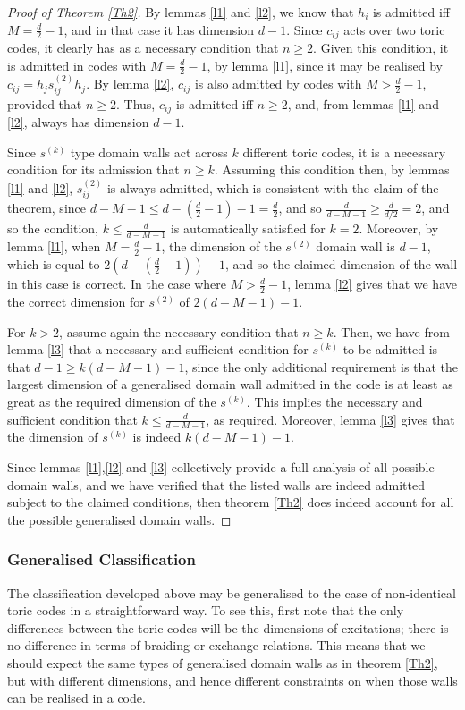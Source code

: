 \documentclass[pra,twocolumn,a4paper,nofootinbib]{revtex4-1}
\begin{document}
\begin{proof} [Proof of Theorem \ref{Th2}]
By lemmas \ref{l1} and \ref{l2}, we know that $h_i$ is admitted iff $M=\frac{d}{2}-1$, and in that case it has dimension $d-1$. Since $c_{ij}$ acts over two toric codes, it clearly has as a necessary condition that $n\geq 2$. Given this condition, it is admitted in codes with $M=\frac{d}{2}-1$, by lemma \ref{l1}, since it may be realised by $c_{ij}=h_j s^{(2)}_{ij} h_j$. By lemma \ref{l2}, $c_{ij}$ is also admitted by codes with $M>\frac{d}{2}-1$, provided that $n \geq 2$. Thus, $c_{ij}$ is admitted iff $n \geq 2$, and, from lemmas \ref{l1} and \ref{l2}, always has dimension $d-1$.

Since $s^{(k)}$ type domain walls act across $k$ different toric codes, it is a necessary condition for its admission that $n\geq k$. Assuming this condition then, by lemmas \ref{l1} and \ref{l2}, $s_{ij}^{(2)}$ is always admitted, which is consistent with the claim of the theorem, since $d-M-1 \leq d-(\frac{d}{2}-1)-1=\frac{d}{2}$, and so $\frac{d}{d-M-1} \geq \frac{d}{d/2}=2$, and so the condition, $k \leq \frac{d}{d-M-1}$ is automatically satisfied for $k=2$. Moreover, by lemma \ref{l1}, when $M=\frac{d}{2}-1$, the dimension of the $s^{(2)}$ domain wall is $d-1$, which is equal to $2(d-(\frac{d}{2}-1))-1$, and so the claimed dimension of the wall in this case is correct. In the case where $M>\frac{d}{2}-1$, lemma \ref{l2} gives that we have the correct dimension for $s^{(2)}$ of $2(d-M-1)-1$.

For $k>2$, assume again the necessary condition that $n \geq k$. Then, we have from lemma \ref{l3} that a necessary and sufficient condition for $s^{(k)}$ to be admitted is that $d-1 \geq k(d-M-1)-1$, since the only additional requirement is that the largest dimension of a generalised domain wall admitted in the code is at least as great as the required dimension of the $s^{(k)}$. This implies the necessary and sufficient condition that $k \leq \frac{d}{d-M-1}$, as required. Moreover, lemma \ref{l3} gives that the dimension of $s^{(k)}$ is indeed $k(d-M-1)-1$.

Since lemmas \ref{l1},\ref{l2} and \ref{l3} collectively provide a full analysis of all possible domain walls, and we have verified that the listed walls are indeed admitted subject to the claimed conditions, then theorem \ref{Th2} does indeed account for all the possible generalised domain walls.
\end{proof}

\subsubsection{Generalised Classification}
\label{VB3}
The classification developed above may be generalised to the case of non-identical toric codes in a straightforward way. To see this, first note that the only differences between the toric codes will be the dimensions of excitations; there is no difference in terms of braiding or exchange relations. This means that we should expect the same types of generalised domain walls as in theorem \ref{Th2}, but with different dimensions, and hence different constraints on when those walls can be realised in a code.
\end{document}
